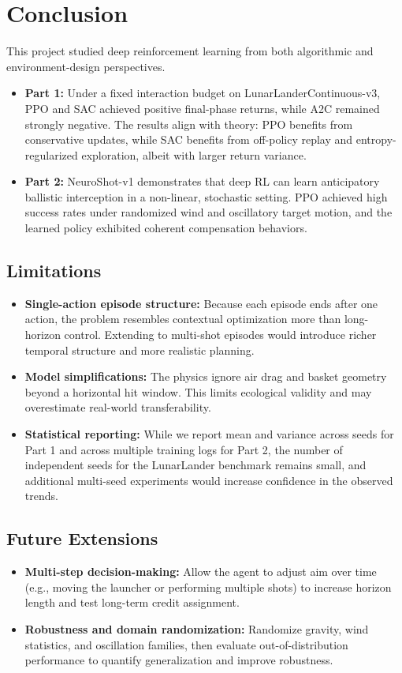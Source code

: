 \documentclass[a4paper,11pt,notitlepage]{report}
\begin{document}
\section{Conclusion}
This project studied deep reinforcement learning from both algorithmic and environment-design perspectives.
\begin{itemize}
    \item \textbf{Part 1:} Under a fixed interaction budget on LunarLanderContinuous-v3, PPO and SAC achieved positive final-phase returns, while A2C remained strongly negative. The results align with theory: PPO benefits from conservative updates, while SAC benefits from off-policy replay and entropy-regularized exploration, albeit with larger return variance.
    \item \textbf{Part 2:} NeuroShot-v1 demonstrates that deep RL can learn anticipatory ballistic interception in a non-linear, stochastic setting. PPO achieved high success rates under randomized wind and oscillatory target motion, and the learned policy exhibited coherent compensation behaviors.
\end{itemize}

\subsection{Limitations}
\begin{itemize}
    \item \textbf{Single-action episode structure:} Because each episode ends after one action, the problem resembles contextual optimization more than long-horizon control. Extending to multi-shot episodes would introduce richer temporal structure and more realistic planning.
    \item \textbf{Model simplifications:} The physics ignore air drag and basket geometry beyond a horizontal hit window. This limits ecological validity and may overestimate real-world transferability.
    \item \textbf{Statistical reporting:} While we report mean and variance across seeds for Part 1 and across multiple training logs for Part 2, the number of independent seeds for the LunarLander benchmark remains small, and additional multi-seed experiments would increase confidence in the observed trends.
\end{itemize}

\subsection{Future Extensions}
\begin{itemize}
    \item \textbf{Multi-step decision-making:} Allow the agent to adjust aim over time (e.g., moving the launcher or performing multiple shots) to increase horizon length and test long-term credit assignment.
    \item \textbf{Robustness and domain randomization:} Randomize gravity, wind statistics, and oscillation families, then evaluate out-of-distribution performance to quantify generalization and improve robustness.
\end{itemize}
\end{document}
